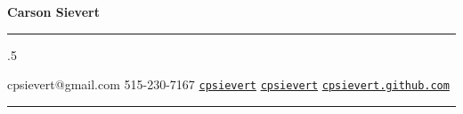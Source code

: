 \centerline{\huge \bf Carson Sievert}

\vspace{2 mm}

\hrule

\vspace{2 mm}


\moveleft.5\hoffset\centerline{
{\Huge \faEnvelope} \hspace{0.5 mm} cpsievert@gmail.com \hspace{1 mm} {\Huge \faPhone}  \hspace{0.5 mm} 515-230-7167  \hspace{1 mm} {\Huge \faGithub}  \hspace{0.5 mm} \href{https://github.com/cpsievert}{\tt cpsievert} \hspace{1 mm} {\Huge \faTwitter} \hspace{0.5 mm} \href{https://twitter.com/cpsievert}{\tt cpsievert} \hspace{1 mm} {\Huge \faGlobe}  \hspace{0.5 mm} \href{https://cpsievert.me}{\tt cpsievert.github.com}
}
\vspace{2 mm}

\hrule